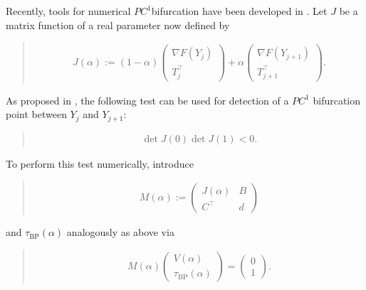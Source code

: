 \documentclass[a4paper,11pt,english]{sphinxmanual}
\begin{document}
Recently, tools for numerical \(PC^{1}\)\sphinxhyphen{}bifurcation have been developed in
. Let \(J\) be a matrix function of a real parameter now defined by
\begin{quote}
\begin{equation*}
\begin{split}J(\alpha) := (1-\alpha)\begin{pmatrix}\nabla F(Y_{j})\\ T_{j}^{\top}\end{pmatrix} + \alpha\begin{pmatrix}\nabla F(Y_{j+1})\\ T_{j+1}^{\top}\end{pmatrix}.\end{split}
\end{equation*}\end{quote}

As proposed in , the following test can be used for detection of
a \(PC^{1}\) bifurcation point between \(Y_{j}\) and \(Y_{j+1}\):
\begin{quote}
\begin{equation*}
\begin{split}\det J(0) \det J(1) < 0.\end{split}
\end{equation*}\end{quote}

To perform this test numerically, introduce
\begin{quote}
\begin{equation*}
\begin{split}M(\alpha) := \begin{pmatrix}J(\alpha)& B\\ C^{\top}& d\end{pmatrix}\end{split}
\end{equation*}\end{quote}

and \(\tau_{\mathrm{BP}}(\alpha)\) analogously as above via
\begin{quote}
\begin{equation*}
\begin{split}M(\alpha) \begin{pmatrix}V(\alpha)\\ \tau_{\mathrm{BP}}(\alpha)\end{pmatrix} = \begin{pmatrix}0\\ 1\end{pmatrix}.\end{split}
\end{equation*}\end{quote}
\end{document}
